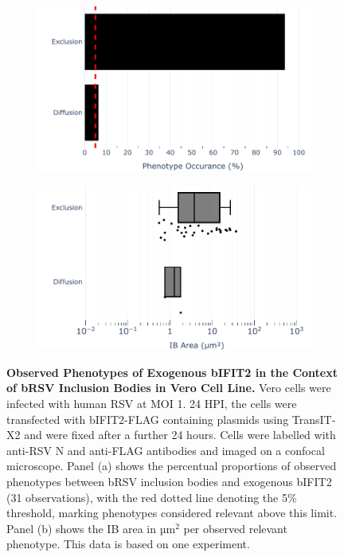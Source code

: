 \begin{figure}
    \begin{subfigure}{0.495\textwidth}
        \caption{}
        \includegraphics[width=1\linewidth]{09. Chapter 4/Figs/02. Overexpression/02. IFIT2/07. bar_bi2f_brsv.pdf} 
    \end{subfigure}
    \begin{subfigure}{0.495\textwidth}
        \caption{}
        \includegraphics[width=1\linewidth]{09. Chapter 4/Figs/02. Overexpression/02. IFIT2/08. box_bi2f_brsv.pdf}
    \end{subfigure}
    \caption[Observed Phenotypes of Exogenous bIFIT2 in the Context of bRSV Inclusion Bodies in Vero Cell Line.]{\textbf{Observed Phenotypes of Exogenous bIFIT2 in the Context of bRSV Inclusion Bodies in Vero Cell Line.} Vero cells were infected with human RSV at MOI 1. 24 HPI, the cells were transfected with bIFIT2-FLAG containing plasmids using TransIT-X2 and were fixed after a further 24 hours. Cells were labelled with anti-RSV N and anti-FLAG antibodies and imaged on a confocal microscope. Panel (a) shows the percentual proportions of observed phenotypes between bRSV inclusion bodies and exogenous bIFIT2 (31 observations), with the red dotted line denoting the 5\% threshold, marking phenotypes considered relevant above this limit. Panel (b) shows the IB area in \(\mbox{µm}^2\) per observed relevant phenotype. This data is based on one experiment.}
    \label{fig:Observed Phenotypes of Exogenous bIFIT2 in the Context of bRSV Inclusion Bodies in Vero Cell Line}
\end{figure}

